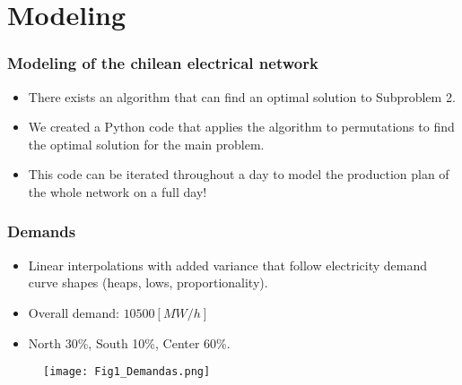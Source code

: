 \documentclass[
11pt, %
]{beamer}
\begin{document}
	\section{Modeling}
	\begin{frame}
		\frametitle{Modeling of the chilean electrical network}
		
		\begin{itemize}
			\item There exists an algorithm that can find an optimal solution to Subproblem 2.
			
			\item We created a Python code that applies the algorithm to permutations to find the optimal solution for the main problem.
			
			\item This code can be iterated throughout a day to model the production plan of the whole network on a full day!
			
		\end{itemize}
	\end{frame}
	
	
	
	
	\begin{frame}
		\frametitle{Demands}
		\begin{itemize}
			\item Linear interpolations with added variance that follow electricity demand curve shapes (heaps, lows, proportionality).
			\item Overall demand: \(10500[MW/h]\)
			\item North 30\%, South 10\%, Center 60\%.
		\end{itemize}
		
		\begin{figure}
			\texttt{[image: Fig1\_Demandas.png]}
		\end{figure}
	\end{frame}
	
	
\end{document}
